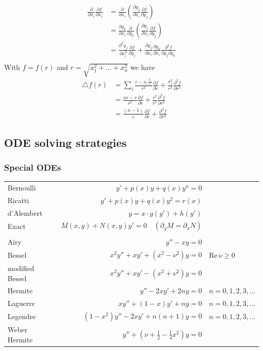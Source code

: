 \documentclass[10pt,a4paper]{book}
\theoremstyle{definition}
\begin{document}
\begin{align}
    \frac{\partial}{\partial x_i}\frac{\partial f}{\partial x_i}
    &=\frac{\partial}{\partial x_i}\left(\frac{\partial y_j}{\partial x_i}\frac{\partial f}{\partial y_j}\right)\\
    &=\frac{\partial y_k}{\partial x_i}\frac{\partial}{\partial y_k}\left(\frac{\partial y_j}{\partial x_i}\frac{\partial f}{\partial y_j}\right)\\
    &=\frac{\partial^2 y_j}{\partial x_i^2}\frac{\partial f}{\partial y_j} + \frac{\partial y_j}{\partial x_i}\frac{\partial y_k}{\partial x_i}\frac{\partial^2 f}{\partial y_j\partial y_k}\\
\end{align}
With $f=f(r)$ and $r=\sqrt{x_1^2+...+x_n^2}$ we have
\begin{align}
    \triangle f(r)
    &=\sum_i \frac{r-x_i \frac{x_i}{r}}{r^2}\frac{\partial f}{\partial r}+\frac{x_i^2}{r^2}\frac{\partial^2 f}{\partial r^2}\\
    &= \frac{nr-r}{r^2}\frac{\partial f}{\partial r}+\frac{r^2}{r^2}\frac{\partial^2 f}{\partial r^2}\\
    &= \frac{(n-1)}{r}\frac{\partial f}{\partial r}+\frac{\partial^2 f}{\partial r^2}
\end{align}

\subsection{ODE solving strategies}
\subsubsection{Special ODEs}
\begin{tabular}{lrl}
Bernoulli       & $y'+p(x)y+q(x)y^n=0$			&\\
Ricatti         & $y'+p(x)y+q(x)y^2=r(x)$		&\\
d'Alembert      & $y=x\cdot g(y')+h(y')$		&\\
Exact           & $M(x,y)+N(x,y)y'=0 \quad (\partial_yM=\partial_xN)$	&\\
                & \\
Airy            & $y''-xy=0$					&\\
Bessel          & $x^2y''+xy'+(x^2-\nu^2)y=0$	& $\text{Re}
\,\nu\ge0$\\
modified Bessel & $x^2y''+xy'-(x^2+\nu^2)y=0$	&\\
Hermite         & $y''-2xy'+2ny=0$				& $n=0,1,2,3,...$\\
Laguerre        & $xy''+(1-x)y'+ny=0$			& $n=0,1,2,3,...$\\
Legendre		& $(1-x^2)y''-2xy'+n(n+1)y=0$	& $n=0,1,2,3,...$\\
Weber Hermite   & $y''+\left(\nu+\frac{1}{2}-\frac{1}{4}x^2\right)y=0$
\end{tabular}
\end{document}
